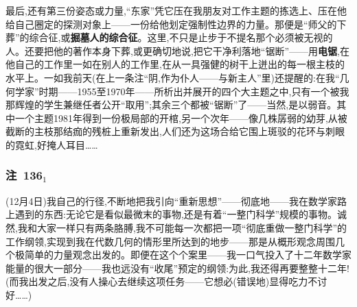 最后,还有第三份姿态或力量,“东家”凭它压在我朋友对工作主题的拣选上、压在他给自己圈定的探测对象上——一份给他划定强制性边界的力量。那便是“师父的下葬”的综合征,或\textbf{掘墓人的综合征}。这里,不只是止步于不提名那个必须被无视的人。还要把他的著作本身下葬,或更确切地说,把它干净利落地“锯断”——用\textbf{电锯},在他自己的工作里一如在别人的工作里,在从一具强健的树干上迸出的每一根主枝的水平上。一如我前天(在上一条注“阴,作为仆人——与新主人”里)还提醒的:在我“几何学家”时期——1955至1970年——所析出并展开的四个大主题之中,只有一个被我那辉煌的学生兼继任者公开“取用”;其余三个都被“锯断”了——当然,是以弱音\dmark{}。其中一个主题1981年得到一份极局部的开棺,另一个次年——像几株孱弱的幼芽,从被截断的主枝那结痂的残桩上重新发出,人们还为这场合给它围上斑驳的花环与刺眼的霓虹,好掩人耳目……

\subsubsection*{注~136$_{1}$}
\label{ch18:local:n44}

(12月4日)我自己的行径,不断地把我引向“重新思想”——彻底地——我在数学家路上遇到的东西:无论它是看似最微末的事物,还是有着“一整门科学”规模的事物。诚然,我和大家一样只有两条胳膊,我不可能每一次都把一项“彻底重做一整门科学”的工作纲领,实现到我在代数几何的情形里所达到的地步——那是从概形观念周围几个极简单的力量观念出发的。即便在这个个案里——我一口气投入了十二年数学家能量的很大一部分——我也远没有“收尾”预定的纲领:为此,我还得再要整整十二年!(而我出发之后,没有人操心去继续这项任务——它想必(错误地)显得吃力不讨好……)

